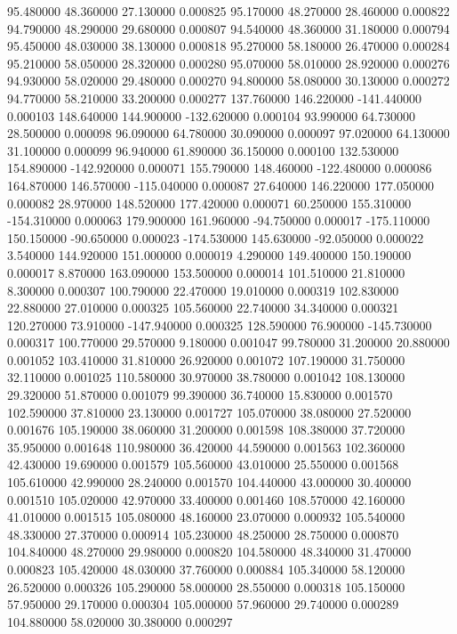 95.480000 48.360000 27.130000 0.000825 
95.170000 48.270000 28.460000 0.000822 
94.790000 48.290000 29.680000 0.000807 
94.540000 48.360000 31.180000 0.000794 
95.450000 48.030000 38.130000 0.000818 
95.270000 58.180000 26.470000 0.000284 
95.210000 58.050000 28.320000 0.000280 
95.070000 58.010000 28.920000 0.000276 
94.930000 58.020000 29.480000 0.000270 
94.800000 58.080000 30.130000 0.000272 
94.770000 58.210000 33.200000 0.000277 
137.760000 146.220000 -141.440000 0.000103 
148.640000 144.900000 -132.620000 0.000104 
93.990000 64.730000 28.500000 0.000098 
96.090000 64.780000 30.090000 0.000097 
97.020000 64.130000 31.100000 0.000099 
96.940000 61.890000 36.150000 0.000100 
132.530000 154.890000 -142.920000 0.000071 
155.790000 148.460000 -122.480000 0.000086 
164.870000 146.570000 -115.040000 0.000087 
27.640000 146.220000 177.050000 0.000082 
28.970000 148.520000 177.420000 0.000071 
60.250000 155.310000 -154.310000 0.000063 
179.900000 161.960000 -94.750000 0.000017 
-175.110000 150.150000 -90.650000 0.000023 
-174.530000 145.630000 -92.050000 0.000022 
3.540000 144.920000 151.000000 0.000019 
4.290000 149.400000 150.190000 0.000017 
8.870000 163.090000 153.500000 0.000014 
101.510000 21.810000 8.300000 0.000307 
100.790000 22.470000 19.010000 0.000319 
102.830000 22.880000 27.010000 0.000325 
105.560000 22.740000 34.340000 0.000321 
120.270000 73.910000 -147.940000 0.000325 
128.590000 76.900000 -145.730000 0.000317 
100.770000 29.570000 9.180000 0.001047 
99.780000 31.200000 20.880000 0.001052 
103.410000 31.810000 26.920000 0.001072 
107.190000 31.750000 32.110000 0.001025 
110.580000 30.970000 38.780000 0.001042 
108.130000 29.320000 51.870000 0.001079 
99.390000 36.740000 15.830000 0.001570 
102.590000 37.810000 23.130000 0.001727 
105.070000 38.080000 27.520000 0.001676 
105.190000 38.060000 31.200000 0.001598 
108.380000 37.720000 35.950000 0.001648 
110.980000 36.420000 44.590000 0.001563 
102.360000 42.430000 19.690000 0.001579 
105.560000 43.010000 25.550000 0.001568 
105.610000 42.990000 28.240000 0.001570 
104.440000 43.000000 30.400000 0.001510 
105.020000 42.970000 33.400000 0.001460 
108.570000 42.160000 41.010000 0.001515 
105.080000 48.160000 23.070000 0.000932 
105.540000 48.330000 27.370000 0.000914 
105.230000 48.250000 28.750000 0.000870 
104.840000 48.270000 29.980000 0.000820 
104.580000 48.340000 31.470000 0.000823 
105.420000 48.030000 37.760000 0.000884 
105.340000 58.120000 26.520000 0.000326 
105.290000 58.000000 28.550000 0.000318 
105.150000 57.950000 29.170000 0.000304 
105.000000 57.960000 29.740000 0.000289 
104.880000 58.020000 30.380000 0.000297 
